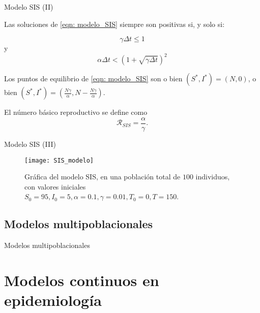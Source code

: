 \begin{frame}{Modelo SIS (II)}

    \begin{proposition}
        Las soluciones de \eqref{eqn: modelo_SIS} siempre son positivas si, y solo si:
        
        $$\gamma \Delta t \leq 1 $$ y $$\alpha\Delta t< \left( 1+\sqrt{\gamma \Delta t} \right)^2$$
        
    \end{proposition}

    \begin{lema}
        Los puntos de equilibrio de \eqref{eqn: modelo_SIS} son o bien $(S^*,I^*)=(N,0)$, o bien $(S^*,I^*)=(\frac{N\gamma}{\alpha}, N-\frac{N\gamma}{\alpha})$.
    \end{lema}

    \begin{definition}
        El número básico reproductivo se define como 
        $$\mathcal{R}_{SIS}=\frac{\alpha}{\gamma}.$$
    \end{definition}
\end{frame}


\begin{frame}{Modelo SIS (III)}


    \begin{figure}
        \begin{center}
        \caption{Gráfica del modelo SIS, en una población total de $100$ individuos, con valores iniciales $S_0=95, I_0 = 5, \alpha = 0.1, \gamma=0.01, T_0 = 0, T = 150$.}
        \texttt{[image: SIS\_modelo]}
        \end{center}
    \end{figure}

\end{frame}



\subsection{Modelos multipoblacionales}


\begin{frame}{Modelos multipoblacionales}

\end{frame}




\section{Modelos continuos en epidemiología}


